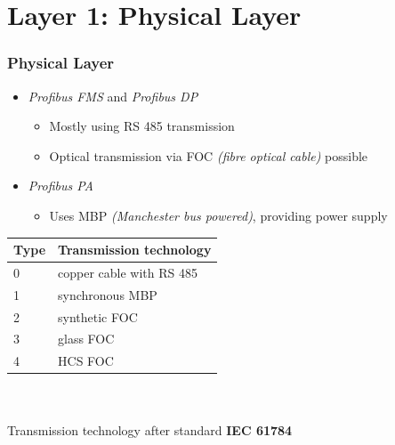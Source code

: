 \documentclass{beamer}
\begin{document}
\section{Layer 1: Physical Layer}
\begin{frame}
  \frametitle{Physical Layer}
  \begin{itemize}
    \item \textit{Profibus FMS} and \textit{Profibus DP}
      \begin{itemize}
        \item Mostly using RS 485 transmission
        \item Optical transmission via FOC \textit{(fibre optical cable)} possible
      \end{itemize}
    \item \textit{Profibus PA}
      \begin{itemize}
        \item Uses MBP \textit{(Manchester bus powered)}, providing power supply
      \end{itemize}
  \end{itemize}
  \vspace{-15pt}
  \center
  \footnotesize
  \begin{tabular}[h]{l|l}
    \textbf{Type} & \textbf{Transmission technology} \\
    \hline
    0             & copper cable with RS 485 \\
    1             & synchronous MBP \\
    2             & synthetic FOC \\
    3             & glass FOC \\
    4             & HCS FOC
  \end{tabular} \\
  \hfill \\
  \normalsize
Transmission technology after standard \textbf{IEC 61784}~\cite{profibusmanual}
\end{frame}
\end{document}
